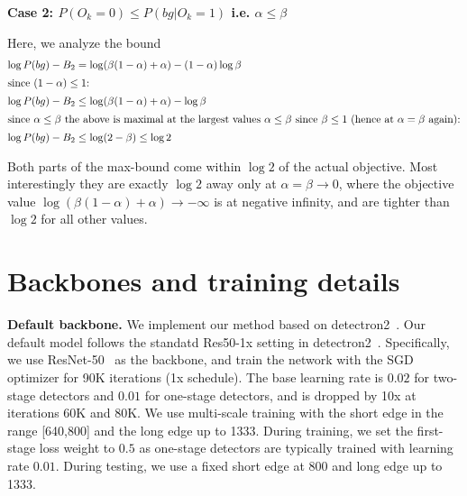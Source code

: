 \documentclass{article}
\renewcommand{\paragraph}[1]{\noindent\textbf{#1}}
\begin{document}
\paragraph{Case 2: $P(O_k=0) \le P(bg|O_k=1)$ i.e. $\alpha \le \beta$}

Here, we analyze the bound
\begin{align*}
  \log P(bg) - B_2 &= \log(\beta(1-\alpha)+\alpha) - (1-\alpha)\log \beta\\
  \intertext{since $(1-\alpha) \le 1$:}
  \log P(bg) - B_2 &\le \log(\beta(1-\alpha)+\alpha) - \log \beta\\
  \intertext{since $\alpha \le \beta$ the above is maximal at the largest values $\alpha \le \beta$ since $\beta \le 1$ (hence at $\alpha = \beta$ again):}
  \log P(bg) - B_2 &\le \log(2-\beta) \le \log 2\\
\end{align*}

Both parts of the max-bound come within $\log 2$ of the actual objective. Most interestingly they are exactly $\log 2$ away only at $\alpha = \beta \to 0$, where the objective value $\log(\beta(1-\alpha)+\alpha) \to -\infty$ is at negative infinity, and are tighter than $\log 2$ for all other values.


\section{Backbones and training details}


\paragraph{Default backbone.}
We implement our method based on detectron2~\cite{wu2019detectron2}.
Our default model follows the standatd Res50-1x setting in detectron2~\cite{wu2019detectron2}.
Specifically, we use ResNet-50~\cite{he2016deep} as the backbone, and train the network with the SGD optimizer for 90K iterations (1x schedule). 
The base learning rate is $0.02$ for two-stage detectors and $0.01$ for one-stage detectors, 
and is dropped by 10x at iterations 60K and 80K.
We use multi-scale training with the short edge in the range [640,800] and the long edge up to 1333.
During training, we set the first-stage loss weight to $0.5$ as one-stage detectors are typically trained with learning rate $0.01$.
During testing, we use a fixed short edge at 800 and long edge up to 1333.
\end{document}
